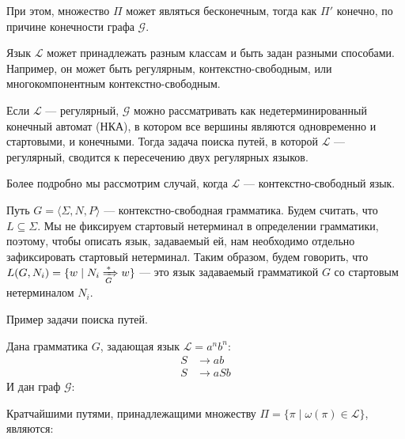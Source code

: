 При этом, множество $\Pi$ может являться бесконечным, тогда как $\Pi'$ конечно, по причине конечности графа $\mathcal{G}$.

Язык $\mathcal{L}$ может принадлежать разным классам и быть задан разными способами. Например, он может быть регулярным, контекстно-свободным, или многокомпонентным контекстно-свободным.

Если $\mathcal{L}$ --- регулярный, $\mathcal{G}$ можно рассматривать как недетерминированный конечный автомат (НКА), в котором все вершины являются одновременно и стартовыми, и конечными.
Тогда задача поиска путей, в которой $\mathcal{L}$ --- регулярный, сводится к пересечению двух регулярных языков.

Более подробно мы рассмотрим случай, когда $\mathcal{L}$ --- контекстно-свободный язык.

Путь $G = \langle \Sigma, N, P \rangle$ --- контекстно-свободная грамматика.
Будем считать, что $L \subseteq \Sigma$.
Мы не фиксируем стартовый нетерминал в определении грамматики, поэтому, чтобы описать язык, задаваемый ей, нам необходимо отдельно зафиксировать стартовый нетерминал.
Таким образом, будем говорить, что $L(G,N_i) = \{ w \mid N_i \xRightarrow[G]{*} w  \}$ --- это язык задаваемый грамматикой $G$ со стартовым нетерминалом $N_i$.

\begin{example}
    Пример задачи поиска путей.

    Дана грамматика $G$, задающая язык $\mathcal{L} = a^n b^n$:
    \begin{align*}
    S   &\to a b \\
    S   &\to a S b
    \end{align*}
    И дан граф $\mathcal{G}:$
    \begin{center}
      
    \end{center}

    Кратчайшими путями, принадлежащими множеству $\Pi = \{\pi \mid \omega(\pi) \in \mathcal{L}\}$, являются:

    \begin{center}
        
    \end{center}

    \begin{center}
        
    \end{center}

\end{example}


